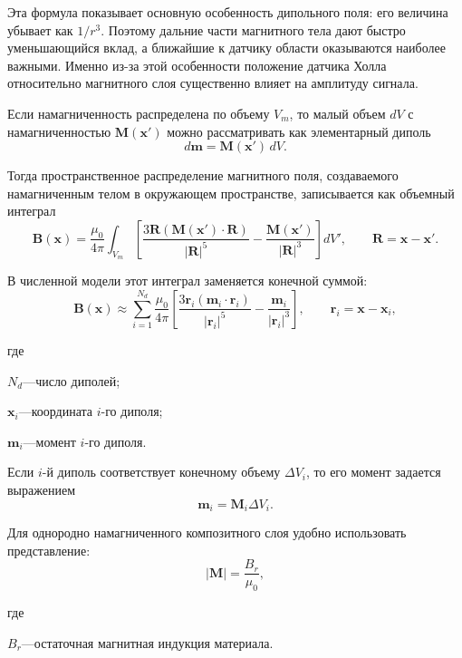 \documentclass[14pt,a4paper]{extarticle}
\newif\ifwherefirst
\newcommand{\whereitem}[2]{%
    \ifwherefirst
        \wherefirstfalse
        #1\hspace{0.25em}---\hspace{0.25em}#2\par
    \else
        \noindent\hspace*{\parindent}\hphantom{где\enspace}#1\hspace{0.25em}---\hspace{0.25em}#2\par
    \fi
}
\newenvironment{whereblock}{%
    \vspace*{-1.55\baselineskip}%
    \begingroup
    \singlespacing
    \wherefirsttrue
    \par\indent где\enspace\ignorespaces
}{%
    \par\endgroup
    \par\vspace{\baselineskip}
}
\begin{document}
Эта формула показывает основную особенность дипольного поля: его величина убывает как \(1/r^3\). Поэтому дальние части магнитного тела дают быстро уменьшающийся вклад, а ближайшие к датчику области оказываются наиболее важными. Именно из-за этой особенности положение датчика Холла относительно магнитного слоя существенно влияет на амплитуду сигнала.

Если намагниченность распределена по объему \(V_m\), то малый объем \(dV\) с намагниченностью \(\mathbf{M}(\mathbf{x}')\) можно рассматривать как элементарный диполь
\begin{equation}
    d\mathbf{m} = \mathbf{M}(\mathbf{x}')\,dV.
\end{equation}

Тогда пространственное распределение магнитного поля, создаваемого намагниченным телом в окружающем пространстве, записывается как объемный интеграл
\begin{equation}
    \mathbf{B}(\mathbf{x})
    =
    \frac{\mu_0}{4\pi}
    \int_{V_m}
    \left[
        \frac{3\mathbf{R}\left(\mathbf{M}(\mathbf{x}')\cdot\mathbf{R}\right)}{\left|\mathbf{R}\right|^5}
        -
        \frac{\mathbf{M}(\mathbf{x}')}{\left|\mathbf{R}\right|^3}
    \right]dV',
    \qquad
    \mathbf{R}=\mathbf{x}-\mathbf{x}'.
\end{equation}

В численной модели этот интеграл заменяется конечной суммой:
\begin{equation}
    \mathbf{B}(\mathbf{x})
    \approx
    \sum_{i=1}^{N_d}
    \frac{\mu_0}{4\pi}
    \left[
        \frac{3\mathbf{r}_i\left(\mathbf{m}_i\cdot\mathbf{r}_i\right)}{\left|\mathbf{r}_i\right|^5}
        -
        \frac{\mathbf{m}_i}{\left|\mathbf{r}_i\right|^3}
    \right],
    \qquad
    \mathbf{r}_i=\mathbf{x}-\mathbf{x}_i,
\end{equation}
\begin{whereblock}
\whereitem{\(N_d\)}{число диполей;}
\whereitem{\(\mathbf{x}_i\)}{координата \(i\)-го диполя;}
\whereitem{\(\mathbf{m}_i\)}{момент \(i\)-го диполя.}
\end{whereblock}

Если \(i\)-й диполь соответствует конечному объему \(\Delta V_i\), то его момент задается выражением
\begin{equation}
    \mathbf{m}_i = \mathbf{M}_i \Delta V_i.
\end{equation}

Для однородно намагниченного композитного слоя удобно использовать представление:
\begin{equation}
    \left|\mathbf{M}\right| = \frac{B_r}{\mu_0},
\end{equation}
\begin{whereblock}
\whereitem{\(B_r\)}{остаточная магнитная индукция материала.}
\end{whereblock}
\end{document}
